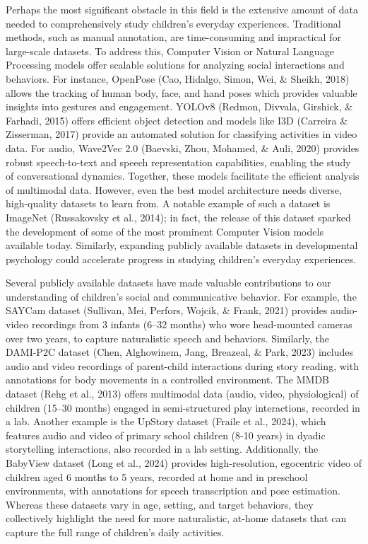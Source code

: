 \documentclass[
  man,floatsintext]{apa6}
\begin{document}
Perhaps the most significant obstacle in this field is the extensive amount of data needed to comprehensively study children's everyday experiences. Traditional methods, such as manual annotation, are time-consuming and impractical for large-scale datasets. To address this, Computer Vision or Natural Language Processing models offer scalable solutions for analyzing social interactions and behaviors. For instance, OpenPose (Cao, Hidalgo, Simon, Wei, \& Sheikh, 2018) allows the tracking of human body, face, and hand poses which provides valuable insights into gestures and engagement. YOLOv8 (Redmon, Divvala, Girshick, \& Farhadi, 2015) offers efficient object detection and models like I3D (Carreira \& Zisserman, 2017) provide an automated solution for classifying activities in video data. For audio, Wave2Vec 2.0 (Baevski, Zhou, Mohamed, \& Auli, 2020) provides robust speech-to-text and speech representation capabilities, enabling the study of conversational dynamics. Together, these models facilitate the efficient analysis of multimodal data. However, even the best model architecture needs diverse, high-quality datasets to learn from. A notable example of such a dataset is ImageNet (Russakovsky et al., 2014); in fact, the release of this dataset sparked the development of some of the most prominent Computer Vision models available today. Similarly, expanding publicly available datasets in developmental psychology could accelerate progress in studying children's everyday experiences.

Several publicly available datasets have made valuable contributions to our understanding of children's social and communicative behavior. For example, the SAYCam dataset (Sullivan, Mei, Perfors, Wojcik, \& Frank, 2021) provides audio-video recordings from 3 infants (6--32 months) who wore head-mounted cameras over two years, to capture naturalistic speech and behaviors. Similarly, the DAMI-P2C dataset (Chen, Alghowinem, Jang, Breazeal, \& Park, 2023) includes audio and video recordings of parent-child interactions during story reading, with annotations for body movements in a controlled environment. The MMDB dataset (Rehg et al., 2013) offers multimodal data (audio, video, physiological) of children (15--30 months) engaged in semi-structured play interactions, recorded in a lab. Another example is the UpStory dataset (Fraile et al., 2024), which features audio and video of primary school children (8-10 years) in dyadic storytelling interactions, also recorded in a lab setting. Additionally, the BabyView dataset (Long et al., 2024) provides high-resolution, egocentric video of children aged 6 months to 5 years, recorded at home and in preschool environments, with annotations for speech transcription and pose estimation. Whereas these datasets vary in age, setting, and target behaviors, they collectively highlight the need for more naturalistic, at-home datasets that can capture the full range of children's daily activities.
\end{document}
